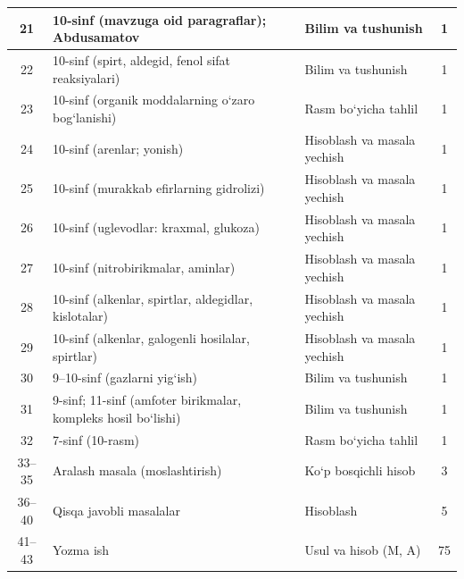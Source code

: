 \documentclass[11pt,a4paper]{article}
\begin{document}
{\begin{longtable}{|c|p{7.2cm}|p{5.4cm}|c|}
21 & 10-sinf (mavzuga oid paragraflar); Abdusamatov & Bilim va tushunish & 1\\\hline
22 & 10-sinf (spirt, aldegid, fenol sifat reaksiyalari) & Bilim va tushunish & 1\\\hline
23 & 10-sinf (organik moddalarning o`zaro bog`lanishi) & Rasm bo`yicha tahlil & 1\\\hline
24 & 10-sinf (arenlar; yonish) & Hisoblash va masala yechish & 1\\\hline
25 & 10-sinf (murakkab efirlarning gidrolizi) & Hisoblash va masala yechish & 1\\\hline
26 & 10-sinf (uglevodlar: kraxmal, glukoza) & Hisoblash va masala yechish & 1\\\hline
27 & 10-sinf (nitrobirikmalar, aminlar) & Hisoblash va masala yechish & 1\\\hline
28 & 10-sinf (alkenlar, spirtlar, aldegidlar, kislotalar) & Hisoblash va masala yechish & 1\\\hline
29 & 10-sinf (alkenlar, galogenli hosilalar, spirtlar) & Hisoblash va masala yechish & 1\\\hline
30 & 9--10-sinf (gazlarni yig`ish) & Bilim va tushunish & 1\\\hline
31 & 9-sinf; 11-sinf (amfoter birikmalar, kompleks hosil bo`lishi) & Bilim va tushunish & 1\\\hline
32 & 7-sinf (10-rasm) & Rasm bo`yicha tahlil & 1\\\hline
33--35 & Aralash masala (moslashtirish) & Ko`p bosqichli hisob & 3\\\hline
36--40 & Qisqa javobli masalalar & Hisoblash & 5\\\hline
41--43 & Yozma ish & Usul va hisob (M, A) & 75\\\hline
\end{longtable}}
\end{document}
